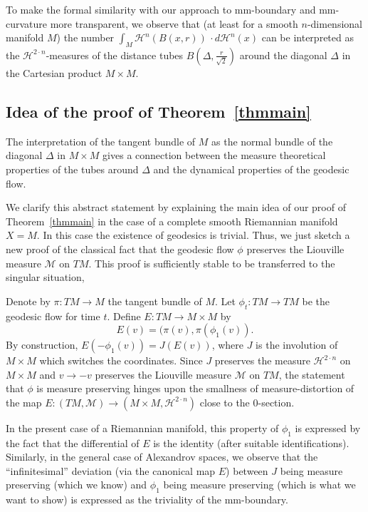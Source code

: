 \documentclass[12pt,leqno,intlimits]{amsart}
\numberwithin{equation}{section}
\theoremstyle{definition}
\theoremstyle{remark}
\newcommand{\tref}[1]{Theorem~\ref{#1}}
\def\:{\colon}
\begin{document}
To make the formal similarity with our approach to mm-boundary and mm-curvature more transparent, we observe that
(at least for a smooth $n$-dimensional manifold $M$) the number $\int _M \mathcal H^n (B(x,r))\, \cdot d\mathcal H^n (x)$ can be interpreted as the $\mathcal H^{2\cdot n}$-measures
of the distance tubes $B(\Delta,{\frac r {\sqrt 2} })$ around the diagonal $\Delta $ in the Cartesian product $M\times M$.

 \subsection{Idea of the proof of \tref{thmmain}}
The interpretation of the tangent bundle of $M$ as the normal bundle of the diagonal $\Delta$ in $M\times M$ gives a connection between
the measure theoretical properties of the tubes around $\Delta$ and the dynamical properties of the geodesic flow.

We clarify this abstract statement by explaining the main idea of our proof of \tref{thmmain} in the case of a complete smooth Riemannian manifold $X=M$.
In this case the existence of geodesics is trivial.
Thus, we just sketch a new proof of the classical fact that the geodesic flow $\phi$ preserves the Liouville measure $\mathcal M$ on $TM$.
This proof is sufficiently stable to be transferred to the singular situation,

Denote by $\pi\: TM\to M$ the tangent bundle of $M$.
Let $\phi_t\: TM\to TM$ be the geodesic flow for time $t$.
 Define $E\:TM\to M\times M$ by
\[E(v)=(\pi(v), \pi (\phi _1 (v)).\]
By construction, $E(-\phi_1(v))= J(E(v))$,
where $J$ is the involution of $M\times M$ which switches the coordinates.
Since $J$ preserves the measure $\mathcal H^{2\cdot n}$ on $M\times M$ and $v\to -v$ preserves the Liouville measure $\mathcal M$ on $TM$,
the statement that $\phi$ is measure preserving hinges upon the smallness of measure-distortion of the map $E \:(TM,\mathcal M) \to (M\times M, \mathcal H^{2\cdot n})$ close to the $0$-section.

In the present case of a Riemannian manifold,
this property of $\phi_1$ is expressed by the fact that the differential of $E$ is the identity (after suitable identifications).
Similarly,
in the general case of Alexandrov spaces, we observe that the ``infinitesimal'' deviation (via the canonical map $E$) between $J$ being measure preserving (which we know) and $\phi _1$ being measure preserving (which is what we want to show)
is expressed as the triviality of the mm-boundary.
\end{document}
